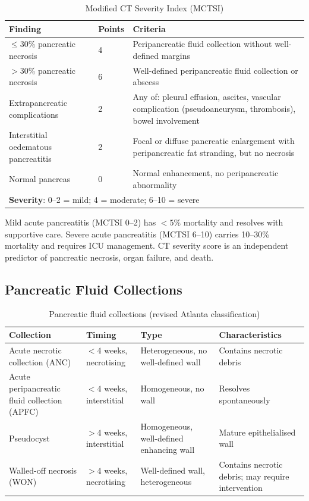 \begin{table}[h]
\centering
\caption{Modified CT Severity Index (MCTSI)}
\begin{tabular}{p{4.5cm} p{3cm} p{3cm}}
\hline
\textbf{Finding} & \textbf{Points} & \textbf{Criteria} \\
\hline
$\leq 30\%$ pancreatic necrosis & 4 & Peripancreatic fluid collection without well-defined margins \\
$> 30\%$ pancreatic necrosis & 6 & Well-defined peripancreatic fluid collection or abscess \\
Extrapancreatic complications & 2 & Any of: pleural effusion, ascites, vascular complication (pseudoaneurysm, thrombosis), bowel involvement \\
Interstitial oedematous pancreatitis & 2 & Focal or diffuse pancreatic enlargement with peripancreatic fat stranding, but no necrosis \\
Normal pancreas & 0 & Normal enhancement, no peripancreatic abnormality \\
\hline
\multicolumn{3}{l}{\textbf{Severity}: 0--2 = mild; 4 = moderate; 6--10 = severe} \\
\hline
\end{tabular}
\end{table}

\begin{pearlbox}
Mild acute pancreatitis (MCTSI 0--2) has $< 5\%$ mortality and resolves with supportive care. Severe acute pancreatitis (MCTSI 6--10) carries 10--30\% mortality and requires ICU management. CT severity score is an independent predictor of pancreatic necrosis, organ failure, and death.
\end{pearlbox}

\subsection{Pancreatic Fluid Collections}
\begin{table}[h]
\centering
\caption{Pancreatic fluid collections (revised Atlanta classification)}
\begin{tabular}{p{3cm} p{3cm} p{3cm} p{3cm}}
\hline
\textbf{Collection} & \textbf{Timing} & \textbf{Type} & \textbf{Characteristics} \\
\hline
Acute necrotic collection (ANC) & $< 4$ weeks, necrotising & Heterogeneous, no well-defined wall & Contains necrotic debris \\
Acute peripancreatic fluid collection (APFC) & $< 4$ weeks, interstitial & Homogeneous, no wall & Resolves spontaneously \\
Pseudocyst & $> 4$ weeks, interstitial & Homogeneous, well-defined enhancing wall & Mature epithelialised wall \\
Walled-off necrosis (WON) & $> 4$ weeks, necrotising & Well-defined wall, heterogeneous & Contains necrotic debris; may require intervention \\
\hline
\end{tabular}
\end{table}

